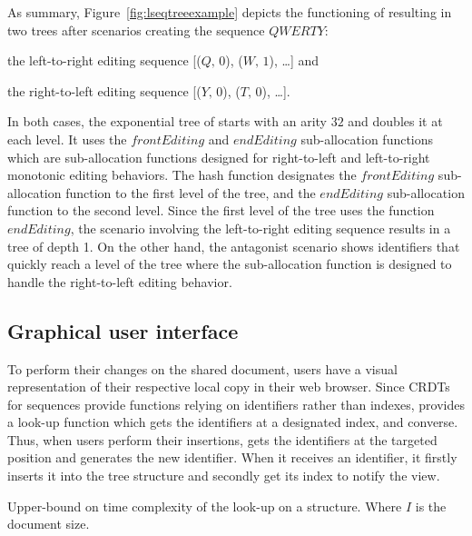 \begin{asparadesc}
\item [As summary,] Figure~\ref{fig:lseqtreeexample} depicts the functioning of
  \LSEQ resulting in two trees after scenarios creating the sequence $QWERTY$:
  \begin{inparaenum}[(i)] 
  \item the left-to-right editing sequence [($Q,\,0$), ($W,\,1$), \ldots] and
  \item the right-to-left editing sequence [($Y,\,0$), ($T,\,0$), \ldots].
  \end{inparaenum}
  In both cases, the exponential tree of \LSEQ starts with an arity $32$ and
  doubles it at each level. It uses the $frontEditing$ and $endEditing$
  sub-allocation functions which are sub-allocation functions designed for
  right-to-left and left-to-right monotonic editing behaviors. The hash function
  designates the $frontEditing$ sub-allocation function to the first level of
  the tree, and the $endEditing$ sub-allocation function to the second
  level. Since the first level of the tree uses the function $endEditing$, the
  scenario involving the left-to-right editing sequence results in a tree of
  depth 1. On the other hand, the antagonist scenario shows \LSEQ identifiers
  that quickly reach a level of the tree where the sub-allocation function is
  designed to handle the right-to-left editing behavior.
\end{asparadesc}

\subsection{Graphical user interface}

To perform their changes on the shared document, users have a visual
representation of their respective local copy in their web browser.  Since CRDTs
for sequences provide functions relying on identifiers rather than indexes,
\CRATE provides a look-up function which gets the identifiers at a designated
index, and converse.  Thus, when users perform their insertions, \CRATE gets the
identifiers at the targeted position and generates the new identifier. When it
receives an identifier, it firstly inserts it into the tree structure and
secondly get its index to notify the view.

\begin{table}
  \centering
  
  \caption{\label{table:lseqlookup}
    Upper-bound on time complexity of the look-up on a \LSEQ structure.
    Where $I$ is the document size.}
\end{table}

